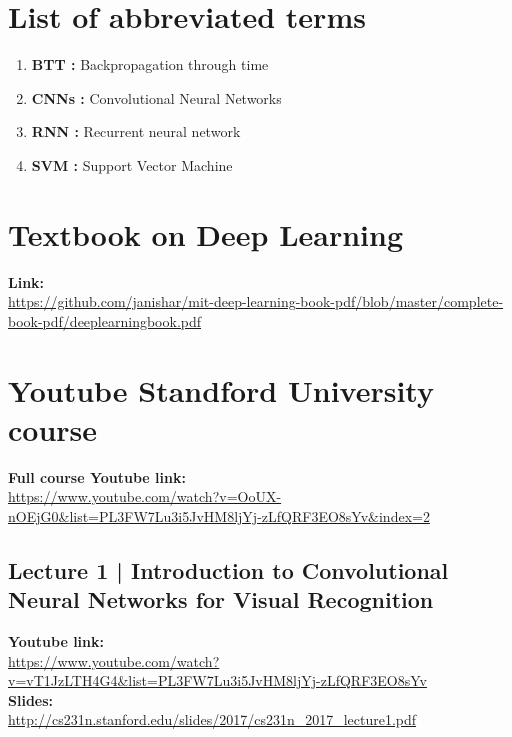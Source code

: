 \documentclass[11pt]{article}
\begin{document}
\setcounter{page}{1}
\section{List of abbreviated terms}
 \begin{multicols}{2}
\begin{enumerate}
\item \textbf{BTT :} Backpropagation through time
\item \textbf{CNNs :} Convolutional Neural Networks 
\item \textbf{RNN :}
Recurrent neural network
\item \textbf{SVM :} Support Vector Machine

\end{enumerate}
\end{multicols}

\clearpage

\clearpage

\listoffigures

\clearpage

\listoftables

\clearpage

\section{Textbook on Deep Learning}
\textbf{Link:}\\
\url{https://github.com/janishar/mit-deep-learning-book-pdf/blob/master/complete-book-pdf/deeplearningbook.pdf}
\section{Youtube Standford University course}
\textbf{Full course Youtube link:}\\
\url{https://www.youtube.com/watch?v=OoUX-nOEjG0&list=PL3FW7Lu3i5JvHM8ljYj-zLfQRF3EO8sYv&index=2}
\subsection{Lecture 1 | Introduction to Convolutional Neural Networks for Visual Recognition}
\textbf{Youtube link:}\\
\url{https://www.youtube.com/watch?v=vT1JzLTH4G4&list=PL3FW7Lu3i5JvHM8ljYj-zLfQRF3EO8sYv}\\
\textbf{Slides:}\\
\url{http://cs231n.stanford.edu/slides/2017/cs231n_2017_lecture1.pdf}\\\\
\end{document}
